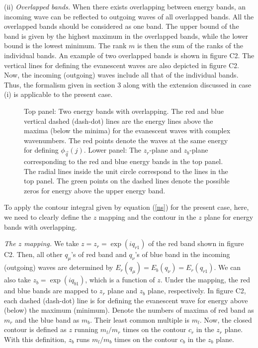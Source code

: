 \documentclass[aps,pra,amsmath,twocolumn,showpacs,bibnotes,10pt]{revtex4-1}
\begin{document}
(ii) {\it Overlapped bands.} When there exists overlapping between energy bands, an incoming wave can be reflected to outgoing waves of all overlapped bands. All the overlapped bands should be considered as one band. The upper bound of the band is given by the highest maximum in the overlapped bands, while the lower bound is the lowest minimum. The rank $m$ is then the sum of the ranks of the individual bands. An example of two overlapped bands is shown in figure C2. The vertical lines for defining the evanescent waves are also depicted in figure C2. Now, the incoming (outgoing) waves include all that of the individual bands. Thus, the formalism given in section 3 along with the extension discussed in case (i) is applicable to the present case. 

\begin{figure}[t]
\centerline{}
\caption{Top panel: Two energy bands with overlapping. The red and blue vertical dashed (dash-dot) lines are the energy lines above the maxima (below the minima) for the evanescent waves with complex wavenumbers. The red points denote the waves at the same energy for defining $\phi_{\vec q}(j)$. Lower panel: The $z_r$-plane and $z_b$-plane corresponding to the red and blue energy bands in the top panel. The radial lines inside the unit circle correspond to the lines in the top panel. The green points on the dashed lines denote the possible zeros for energy above the upper energy band.}
\end{figure}

To apply the contour integral given by equation (\ref{ns}) for the present case, here, we need to clearly define the $z$ mapping and the contour in the $z$ plane for energy bands with overlapping. 

{\it The $z$ mapping.} We take $z = z_{r} = \exp(iq_{r1})$ of the red band shown in figure C2. Then, all other $q_{\mu}$'s of red band and $q_{\nu}$'s of blue band in the incoming (outgoing) waves are determined by $E_r(q_{\mu}) = E_b(q_{\nu}) = E_r(q_{r1})$. We can also take $z_b = \exp(iq_{b1})$, which is a function of $z$. Under the mapping, the red and blue bands are mapped to $z_r$ plane and $z_b$ plane, respectively. In figure C2, each dashed (dash-dot) line is for defining the evanescent wave for energy above (below) the maximum (minimum). Denote the numbers of maxima of red band as $m_r$ and the blue band as $m_b$. Their least common multiple is $m_l$. Now, the closed contour is defined as $z$ running $m_l/m_r$ times on the contour $c_r$ in the $z_r$ plane. With this definition, $z_b$ runs $m_l/m_b$ times on the contour $c_b$ in the $z_b$ plane.
\end{document}
